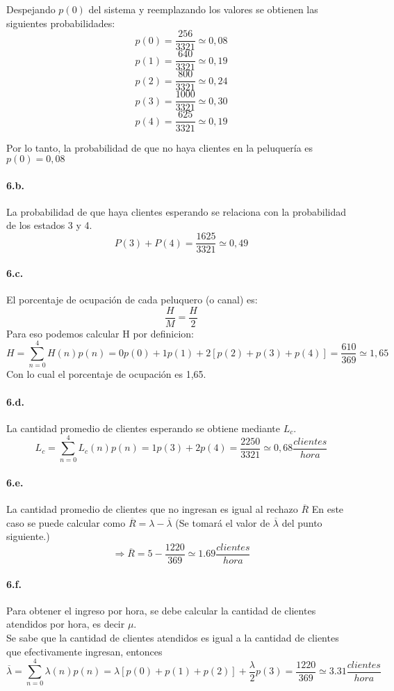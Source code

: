 \documentclass{article}
\begin{document}
    Despejando $p(0)$ del sistema y reemplazando los valores se obtienen las siguientes probabilidades:
    $$ p(0) = \frac{256}{3321} \simeq 0,08$$
    $$ p(1) = \frac{640}{3321} \simeq 0,19$$
    $$ p(2) = \frac{800}{3321} \simeq 0,24$$
    $$ p(3) = \frac{1000}{3321}\simeq 0,30$$
    $$ p(4) = \frac{625}{3321} \simeq 0,19$$
    
    Por lo tanto, la probabilidad de que no haya clientes en la peluquería es $p(0) = 0,08$
       
    
    \paragraph{6.b.} La probabilidad de que haya clientes esperando se relaciona con la probabilidad de los estados 3 y 4. \\
    $$P(3) + P(4) = \frac{1625}{3321} \simeq 0,49$$
    
    \paragraph{6.c.} El porcentaje de ocupación de cada peluquero (o canal) es: \\
    $$\frac{H}{M} = \frac{H}{2}$$
    Para eso podemos calcular H por definicion:
    $$H = \sum_{n=0}^{4}H(n) p(n) = 0 p(0) + 1 p(1) + 2[p(2)+p(3)+p(4)] = \frac{610}{369} \simeq 1,65 $$
    Con lo cual el porcentaje de ocupación es 1,65.    
    
    \paragraph{6.d.} La cantidad promedio de clientes esperando se obtiene mediante $L_c$.
    $$L_c = \sum_{n=0}^{4}L_c(n) p(n) = 1 p(3) + 2 p(4) = \frac{2250}{3321} \simeq 0,68 \frac{clientes}{hora}$$
    
    
    \paragraph{6.e.} La cantidad promedio de clientes que no ingresan es igual al rechazo  $ \overline{R}$
    En este caso se puede calcular como $ \overline{R} = \lambda - \overline{\lambda}$ (Se tomará el valor de $\overline{\lambda}$ del punto siguiente.)
    $$ \Rightarrow \overline{R} = 5 - \frac{1220}{369} \simeq 1.69 \frac{clientes}{hora}$$
    
    
    \paragraph{6.f.} Para obtener el ingreso por hora, se debe calcular la cantidad de clientes atendidos por hora, es decir $\mu$.\\
    Se sabe que la cantidad de clientes atendidos es igual a la cantidad de clientes que efectivamente ingresan, entonces \\
    $$ \overline{\lambda} = \sum_{n=0}^{4}\lambda(n) p(n) = \lambda [ p(0)+p(1)+p(2) ] + \frac{\lambda}{2} p(3) = \frac{1220}{369} \simeq 3.31 \frac{clientes}{hora}$$
 
\end{document}
